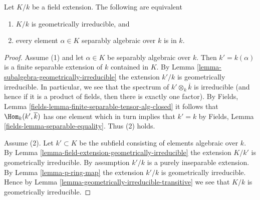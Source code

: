 \begin{lemma}
\label{lemma-geometrically-irreducible-separable-elements}
Let $K/k$ be a field extension. The following are equivalent
\begin{enumerate}
\item $K/k$ is geometrically irreducible, and
\item every element $\alpha \in K$ separably algebraic over $k$ is
in $k$.
\end{enumerate}
\end{lemma}

\begin{proof}
Assume (1) and let $\alpha \in K$ be separably algebraic over $k$.
Then $k' = k(\alpha)$ is a finite separable extension of $k$ contained
in $K$. By Lemma \ref{lemma-subalgebra-geometrically-irreducible}
the extension $k'/k$ is geometrically irreducible.
In particular, we see that the spectrum of $k' \otimes_k \overline{k}$
is irreducible (and hence if it is a product of fields, then there
is exactly one factor).
By Fields, Lemma \ref{fields-lemma-finite-separable-tensor-alg-closed}
it follows that $\Hom_k(k', \overline{k})$ has one element which in turn
implies that $k' = k$ by
Fields, Lemma \ref{fields-lemma-separable-equality}.
Thus (2) holds.

\medskip\noindent
Assume (2). Let $k' \subset K$ be the subfield consisting of elements
algebraic over $k$. By
Lemma \ref{lemma-field-extension-geometrically-irreducible}
the extension $K/k'$ is geometrically irreducible.
By assumption $k'/k$ is a purely inseparable extension.
By Lemma \ref{lemma-p-ring-map} the extension
$k'/k$ is geometrically irreducible. Hence by
Lemma \ref{lemma-geometrically-irreducible-transitive}
we see that $K/k$ is geometrically irreducible.
\end{proof}
